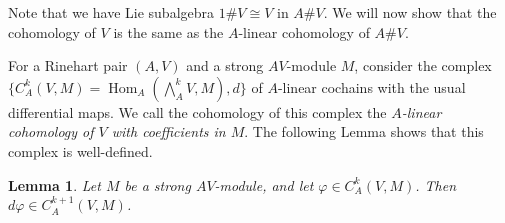 \documentclass[12pt]{amsart}
\newcommand{\Hom}{{\operatorname{Hom}}}
\newcommand{\vphi}{{\varphi}}
\renewcommand{\sp}{{\#}}
\newtheorem{lemma}[theorem]{Lemma}
\theoremstyle{definition}
\begin{document}
Note that we have Lie subalgebra $1 \sp V \cong V$ in $A \sp V$. 
We will now show that the cohomology of $V$ is the same as the $A$-linear cohomology of $A \sp V$. 


For a Rinehart pair $(A, V)$ and a strong $AV$-module $M$,
consider the complex $\{C_A^k(V, M) = \Hom_A(\bigwedge^k_A V, M), d\}$ of $A$-linear cochains with the usual differential maps. We call the cohomology of this complex the \emph{$A$-linear cohomology of $V$ with coefficients in $M$}. The following Lemma shows that this complex is well-defined.
\begin{lemma}
Let $M$ be a strong $AV$-module, and let $\vphi \in C_A^k(V, M)$. Then 
$d\vphi \in C_A^{k+1}(V, M)$.
\end{lemma}
\end{document}
